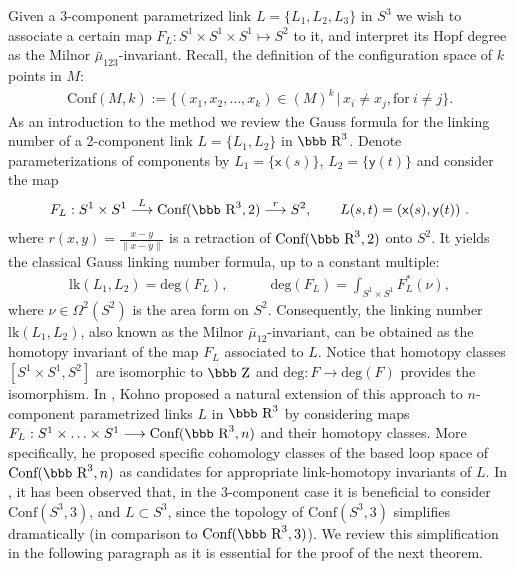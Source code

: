 \documentclass[12pt]{article}
\newcommand{\R}{\mbox{\bbb R}}       %
\newcommand{\Z}{\mbox{\bbb Z}}
\newcommand{\Cnf}{\text{Conf}}
\newcommand{\no}{\noindent}
\begin{document}
\no Given a 3-component parametrized link $L=\{L_1,L_2,L_3\}$ in $S^3$
we wish to associate a certain map $F_L:S^1\times S^1\times S^1\mapsto S^2$ to it, and interpret its Hopf degree as the Milnor $\bar{\mu}_{123}$-invariant. Recall, the definition of the configuration space of $k$ points in $M$:
\begin{gather*}
 \text{Conf}(M,k):=\{(x_1,x_2,\ldots, x_k)\in (M)^k\,|\,x_i\neq x_j,\text{for}\ i\neq j\}.
\end{gather*}
As an introduction to the method we review the Gauss formula for the linking number of 
a 2-component link $L=\{L_1, L_2\}$ in $\R^3$. Denote parameterizations 
of components by  $L_1=\{\mathsf{x}(s)\}$, $L_2=\{\mathsf{y}(t)\}$ and consider the map
\begin{gather*}
 F_L:S^1\times S^1\stackrel{L}{\longrightarrow} \Cnf(\R^3,2) \stackrel{r}{\longrightarrow} S^2,\qquad L(s,t)=(\mathsf{x}(s), \mathsf{y}(t))\ .
\end{gather*}
where $r(x,y)=\frac{x-y}{\|x-y\|}$ is a retraction of $\Cnf(\R^3,2)$ onto $S^2$.
It yields the classical Gauss linking number formula, up to a constant multiple:
\begin{gather*}
 \text{lk}(L_1,L_2)=\text{deg}(F_L),\qquad\quad \text{deg}(F_L)=\int_{S^1\times S^1} F^\ast_L(\nu),
\end{gather*}
where $\nu\in \Omega^2(S^2)$ is the 
area form on $S^2$. Consequently, the linking number $\text{lk}(L_1,L_2)$,
also known as the Milnor $\bar{\mu}_{12}$-invariant, can be obtained as the homotopy invariant 
of the map $F_L$ associated to $L$. Notice that homotopy classes $[S^1\times S^1,S^2]$ are 
isomorphic to $\Z$ and $\text{deg}:F\rightarrow \text{deg}(F)$ provides the isomorphism. In \cite{Kohno02},
Kohno proposed a natural extension of this approach to $n$-component parametrized links $L$ in $\R^3$ by considering maps $F_L:S^1\times\ldots\times S^1\longrightarrow \Cnf(\R^3,n)$ and their homotopy classes. More specifically, he proposed specific cohomology classes of the based loop space of $\Cnf(\R^3,n)$ as candidates for appropriate link-homotopy invariants of $L$. In \cite{Deturck-Gluck-Melvin-Shonkwiler08}, it has been observed that, in the $3$-component case it is  beneficial to consider $\Cnf(S^3,3)$, and $L\subset S^3$, since the topology of $\Cnf(S^3,3)$ simplifies dramatically (in comparison to $\Cnf(\R^3,3)$). We review this 
simplification in the following paragraph as it is essential for the proof of the next theorem.
\end{document}
